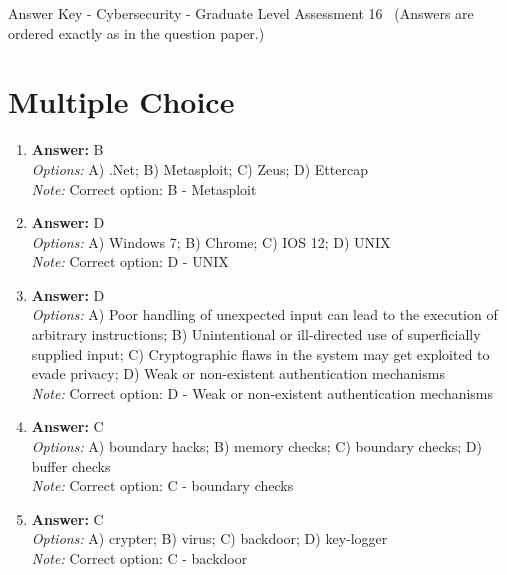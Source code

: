 \documentclass[12pt]{article}
\begin{document}
\begin{center}
Answer Key - Cybersecurity - Graduate Level Assessment 16 \
\small (Answers are ordered exactly as in the question paper.)
\end{center}

\section*{Multiple Choice}
\begin{enumerate}[label=\arabic*.]
\item \textbf{Answer:} B
\\ \textit{Options:} A) .Net; B) Metasploit; C) Zeus; D) Ettercap
\\ \textit{Note:} Correct option: B - Metasploit
\item \textbf{Answer:} D
\\ \textit{Options:} A) Windows 7; B) Chrome; C) IOS 12; D) UNIX
\\ \textit{Note:} Correct option: D - UNIX
\item \textbf{Answer:} D
\\ \textit{Options:} A) Poor handling of unexpected input can lead to the execution of arbitrary instructions; B) Unintentional or ill-directed use of superficially supplied input; C) Cryptographic flaws in the system may get exploited to evade privacy; D) Weak or non-existent authentication mechanisms
\\ \textit{Note:} Correct option: D - Weak or non-existent authentication mechanisms
\item \textbf{Answer:} C
\\ \textit{Options:} A) boundary hacks; B) memory checks; C) boundary checks; D) buffer checks
\\ \textit{Note:} Correct option: C - boundary checks
\item \textbf{Answer:} C
\\ \textit{Options:} A) crypter; B) virus; C) backdoor; D) key-logger
\\ \textit{Note:} Correct option: C - backdoor
\end{enumerate}
\end{document}
